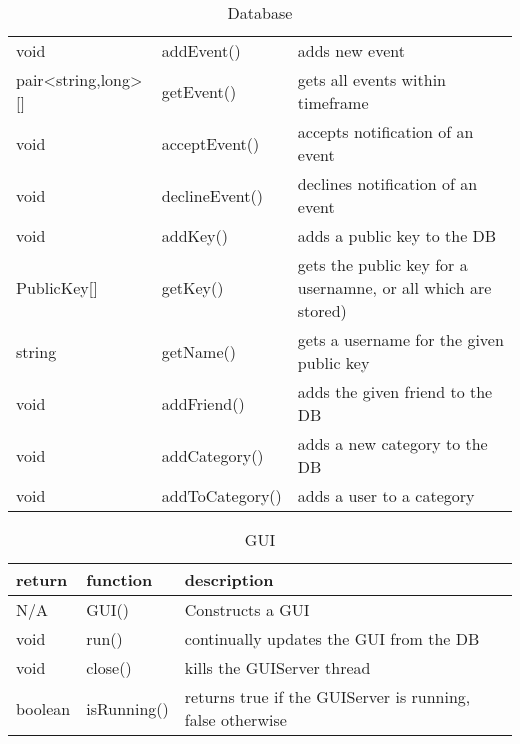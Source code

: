 \begin{table}[h]
\begin{tabular}{p{3cm}p{3cm}p{9cm}}
    void                & addEvent()     & adds new event\\
    pair<string,long>[] & getEvent()     & gets all events within timeframe\\
    void                & acceptEvent()  & accepts notification of an event\\
    void                & declineEvent() & declines notification of an event\\
    
    void        & addKey()  & adds a public key to the DB\\
    PublicKey[] & getKey()  & gets the public key for a usernamne, or all which are stored)\\
    string      & getName() & gets a username for the given public key\\

    void & addFriend()     & adds the given friend to the DB\\
    void & addCategory()   & adds a new category to the DB\\
    void & addToCategory() & adds a user to a category\\
    \end{tabular}
    \caption{Database}
\end{table}

\begin{table}[h]
    \centering
    \begin{tabular}{p{1cm}p{2.6cm}p{9cm}}
    return  & function    & description\\ \hline
    N/A     & GUI()       & Constructs a GUI\\
    void    & run()       & continually updates the GUI from the DB\\
    void    & close()     & kills the GUIServer thread\\
    boolean & isRunning() & returns true if the GUIServer is running, false otherwise\\
    \end{tabular}
    \caption{GUI}
\end{table}

